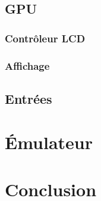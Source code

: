 \documentclass[a4paper]{article}
\begin{document}
\subsection{GPU}
\subsubsection{Contrôleur LCD}

\subsubsection{Affichage}


\subsection{Entrées}


\section{Émulateur}


\section{Conclusion}
\end{document}
